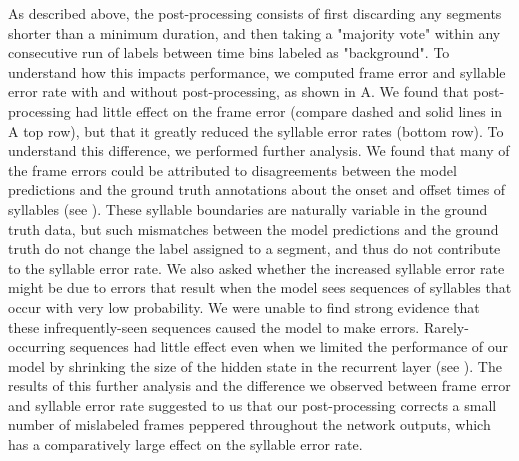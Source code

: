 \documentclass[9pt,lineno]{elife}
\begin{document}
As described above, 
the post-processing consists of first discarding any segments shorter than a minimum duration, 
and then taking a "majority vote" within any consecutive run of labels between time bins labeled as "background". 
To understand how this impacts performance, 
we computed frame error and syllable error rate with and without post-processing,   
as shown in A.
We found that post-processing had little effect on the frame error
(compare dashed and solid lines in A top row), 
but that it greatly reduced the syllable error rates (bottom row).
To understand this difference, we performed further analysis. 
We found that many of the frame errors could be attributed to disagreements 
between the model predictions and the ground truth annotations 
about the onset and offset times of syllables 
(see ). 
These syllable boundaries are naturally variable in the ground truth data, 
but such mismatches between the model predictions and the ground truth
do not change the label assigned to a segment, 
and thus do not contribute to the syllable error rate.
We also asked whether the increased syllable error rate might be due to 
errors that result when the model sees sequences of syllables that occur with very low probability. 
We were unable to find strong evidence 
that these infrequently-seen sequences caused the model to make errors. 
Rarely-occurring sequences had little effect 
even when we limited the performance of our model by 
shrinking the size of the hidden state in the recurrent layer
(see ).
The results of this further analysis 
and the difference we observed between frame error and syllable error rate
suggested to us that our post-processing corrects a small number of mislabeled frames 
peppered throughout the network outputs, 
which has a comparatively large effect on the syllable error rate.
\end{document}

